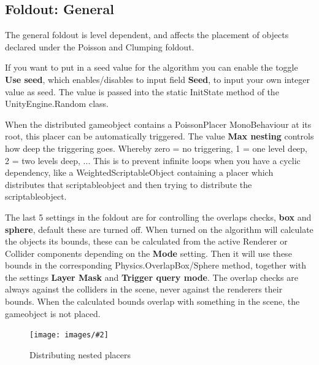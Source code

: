 \documentclass{paper}
\newlength{\imgwidth} %
\newcommand\scalegraphics[3][]
{
	\begin{figure}[H]
	\centering
	\settowidth{\imgwidth}{\texttt{[image: images/\#2]}} %
	\setlength{\imgwidth}{\minof{#1\imgwidth}{\textwidth}} %
	\texttt{[image: images/\#2]} %
	\caption{#3}
	\end{figure}
}
\newcommand*\bracket[1]{\lbrack#1\rbrack} %
\begin{document}
\subsection{Foldout: General}\label{subsec:pdd_g}
The general foldout is level dependent, and affects the placement of objects declared under the Poisson and Clumping foldout.
\par
If you want to put in a seed value for the algorithm you can enable the toggle \textbf{Use seed}, which enables/disables to input field \textbf{Seed}, to input your own integer value as seed. The value is passed into the static InitState method of the UnityEngine.Random class.
\par
When the distributed gameobject contains a PoissonPlacer MonoBehaviour at its root, this placer can be automatically triggered. The value \textbf{Max nesting} controls how deep the triggering goes. Whereby zero = no triggering, 1 = one level deep, 2 = two levels deep, ... This is to prevent infinite loops when you have a cyclic dependency, like a WeightedScriptableObject containing a placer which distributes that scriptableobject and then trying to distribute the scriptableobject.
\par
The last 5 settings in the foldout are for controlling the overlaps checks, \textbf{box} and \textbf{sphere}, default these are turned off. When turned on the algorithm will calculate the objects its bounds, these can be calculated from the active Renderer or Collider components depending on the \textbf{Mode} setting. Then it will use these bounds in the corresponding Physics.Overlap\bracket{Box/Sphere} method, together with the settings \textbf{Layer Mask} and \textbf{Trigger query mode}. The overlap checks are always against the colliders in the scene, never against the renderers their bounds. When the calculated bounds overlap with something in the scene, the gameobject is not placed.
\scalegraphics[0.6]{General.png}{Distributing nested placers}

\newpage
\end{document}

